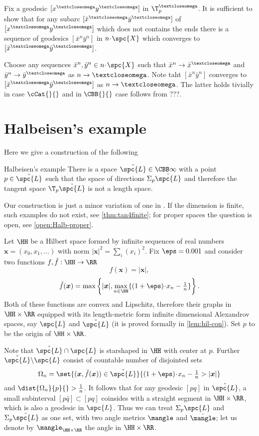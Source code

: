 Fix a geodesic $[x^\o y^\o]$ in $\T^\o_p$.
It is sufficient to show that for any subarc $[\bar x^\o \bar y^\o]$ of $[x^\o y^\o]$
which does not contains the ends
there is a sequence of geodesics $[\bar x^n\bar y^n]$ in $n\cdot \spc{X}$ which converges to $[\bar x^\o\bar y^\o]$.

Choose any sequences $\bar x^n,\bar y^n\in n\cdot \spc{X}$ such that $\bar x^n\to \bar x^\o$ and $\bar y^n\to \bar y^\o$ as $n\to\o$.
Note taht $[\bar x^n \bar y^n]$ 
converges to $[\bar x^\o \bar y^\o]$
as $n\to\o$.
The latter holds tivially in case $\cCat{}{}$
and in $\CBB{}{}$ case follows from ???.
\qeds



\section{Halbeisen's example}\label{halbeisen}

Here we give a construction of the following

\begin{thm}{Halbeisen's example}
There is a space $\check{\spc{L}}\in\CBB\infty{}$
with a point $p\in\check{\spc{L}}$ such that the space of directions $\Sigma_p\check{\spc{L}}$ and therefore the tangent space $\T_p\check{\spc{L}}$ is not a length space. 
\end{thm}

Our construction is just a minor variation of one in \cite{halbeisen}.
If the dimension is finite, such examples do not exist, see \ref{thm:tan4finite}; 
for proper spaces the question is open, see \ref{open:Halb-proper}.

Let $\HH$ be a Hilbert space formed by infinite sequences of real numbers $\bm{x}=(x_0,x_1,\dots)$ with norm
$|\bm{x}|^2=\sum_i(x_i)^2$. 
Fix $\eps=0.001$ and consider two functions $f,\check f:\HH\to\RR$
\[f(\bm{x})=|\bm{x}|,\]
\[\check f(\bm{x})
=
\max\left\{|\bm{x}|,\max_{n\in\NN}\{(1+\eps)\cdot x_n-\tfrac{1}{n}\}\right\}.\] 
Both of these functions are convex and Lipschitz, therefore their graphs in $\HH\times \RR$ equipped with its length-metric form infinite dimensional Alexandrov spaces, say $\spc{L}$  and $\check{\spc{L}}$ (it is proved formally in \ref{lem:hil-con}).
Set $p$ to be the origin of $\HH\times \RR$.

Note that $\check{\spc{L}}\cap\spc{L}$ is starshaped in $\HH$ with center at $p$.
Further $\check{\spc{L}}\backslash\spc{L}$ consist of countable number of disjointed sets
\[\Omega_n=\set{(\bm{x},\check f(\bm{x}))\in\check{\spc{L}}}{(1+\eps)\cdot x_n-\tfrac{1}{n}>|\bm{x}|}\]
and $\dist{\Omega_n}{p}{}>\tfrac{1}{n}$.
It follows that for any geodesic $[p q]$ in $\check{\spc{L}}$,
a small subinterval $[p \bar q]\subset [p q]$ 
coinsides with a straight segment in $\HH\times\RR$, 
which is also a geodesic in $\spc{L}$.
Thus we can treat $\Sigma_p\spc{L}$ and $\Sigma_p\check{\spc{L}}$ as one set, with two angle metrics $\mangle$ and $\check\mangle$;
let us denote by $\mangle_{\HH\times \RR}$ the angle in $\HH\times\RR$.

